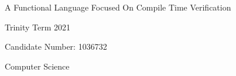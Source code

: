 \documentclass[12pt,a4paper,titlepage]{article}
\begin{document}
    \begin{titlepage}
        \begin{center}
            \vspace*{2in}
            \Huge
            A Functional Language Focused On Compile Time Verification
            \Large

            Trinity Term 2021

            Candidate Number: 1036732

            Computer Science
        \end{center}
    \end{titlepage}

    

    \tableofcontents

    

    

    

    

    

    
    

    \singlespacing
    
\end{document}
